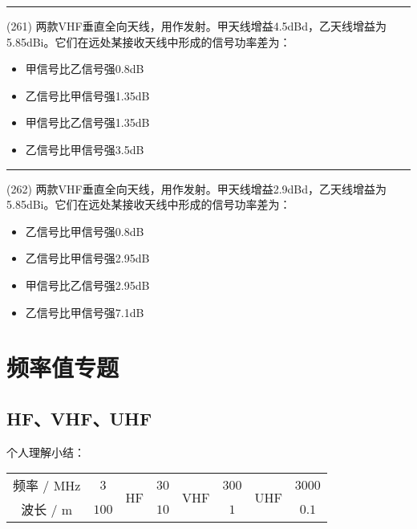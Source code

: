 \documentclass[twocolumn,hyperref,UTF8]{ctexart}  %
\begin{document}
\noindent\rule{0.5\textwidth}{1pt}
\heiti (261) 两款VHF垂直全向天线，用作发射。甲天线增益4.5dBd，乙天线增益为5.85dBi。它们在远处某接收天线中形成的信号功率差为： \songti {\color{gray} [LK0932] }
\begin{itemize}
	\item  甲信号比乙信号强0.8dB
	\item  乙信号比甲信号强1.35dB
	\item  甲信号比乙信号强1.35dB
	\item  乙信号比甲信号强3.5dB
\end{itemize}


\noindent\rule{0.5\textwidth}{1pt}
\heiti (262) 两款VHF垂直全向天线，用作发射。甲天线增益2.9dBd，乙天线增益为5.85dBi。它们在远处某接收天线中形成的信号功率差为： \songti {\color{gray} [LK0933] }
\begin{itemize}
	\item  乙信号比甲信号强0.8dB
	\item  乙信号比甲信号强2.95dB
	\item  甲信号比乙信号强2.95dB
	\item  乙信号比甲信号强7.1dB
\end{itemize}





\clearpage
\section{频率值专题}

\subsection{HF、VHF、UHF}




个人理解小结：
\begin{table}[htb]
	\begin{center}
		\begin{tabular}{|c|ccccccc|}
			\hline
			频率 / MHz & $3$   & \multirow{2}{0.5cm}{HF}  &  $30$  &  \multirow{2}{0.5cm}{VHF}  &  $300$  &  \multirow{2}{0.5cm}{UHF}  &  $3000$ \\
			波长 / m   & $100$ &                          &  $10$  &                            &  $1$    &                            &  $0.1$  \\
			\hline
		\end{tabular}
	\end{center}
\end{table}
\end{document}
